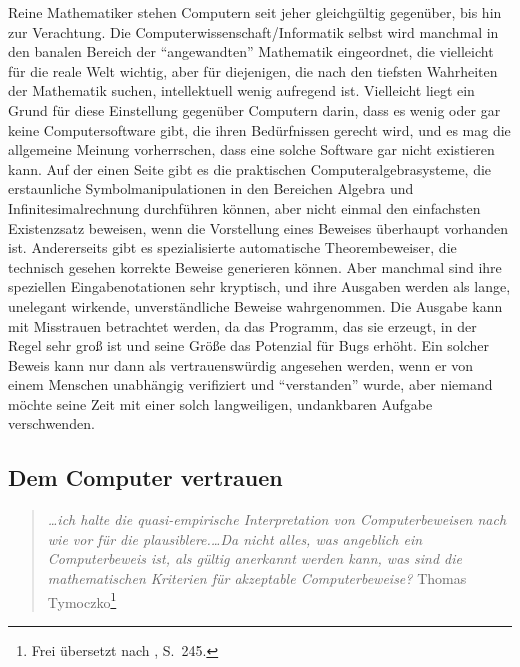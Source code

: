 Reine Mathematiker stehen Computern seit jeher gleichgültig gegenüber, bis hin zur Verachtung.  Die Computerwissenschaft/Informatik selbst wird manchmal in den banalen Bereich der "`angewandten"' Mathematik eingeordnet, die vielleicht für die reale Welt wichtig, aber für diejenigen, die nach den tiefsten Wahrheiten der Mathematik suchen, intellektuell wenig aufregend ist.  Vielleicht liegt ein Grund für diese Einstellung gegenüber Computern darin, dass es wenig oder gar keine Computersoftware gibt, die ihren Bedürfnissen gerecht wird, und es mag die allgemeine Meinung vorherrschen, dass eine solche Software gar nicht existieren kann.  Auf der einen Seite gibt es die praktischen Computeralgebrasysteme, die erstaunliche Symbolmanipulationen in den Bereichen Algebra und Infinitesimalrechnung durchführen können, aber nicht einmal den einfachsten Existenzsatz beweisen, wenn die Vorstellung eines Beweises überhaupt vorhanden ist.  Andererseits gibt es spezialisierte automatische Theorembeweiser, die technisch gesehen korrekte Beweise generieren können.  Aber manchmal sind ihre speziellen Eingabenotationen sehr kryptisch, und ihre Ausgaben werden als lange, unelegant wirkende, unverständliche Beweise wahrgenommen. 
Die Ausgabe kann mit Misstrauen betrachtet werden, da das Programm, das sie erzeugt, in der Regel sehr groß ist und seine Größe das Potenzial für Bugs erhöht.
Ein solcher Beweis kann nur dann als vertrauenswürdig angesehen werden, wenn er von einem Menschen unabhängig verifiziert und "`verstanden"' wurde, aber niemand möchte seine Zeit mit einer solch langweiligen, undankbaren Aufgabe verschwenden.



\subsection{Dem Computer vertrauen}

\begin{quote}
  {\em \ldots ich halte die quasi-empirische Interpretation von Computerbeweisen nach wie vor für die plausiblere.\ldots Da nicht alles, was angeblich ein Computerbeweis ist, als gültig anerkannt werden kann, was sind die mathematischen Kriterien für akzeptable Computerbeweise?}
    \flushright\sc  Thomas Tymoczko\footnote{Frei übersetzt nach \cite{Tymoczko}, S.~245.}\\
\end{quote}

